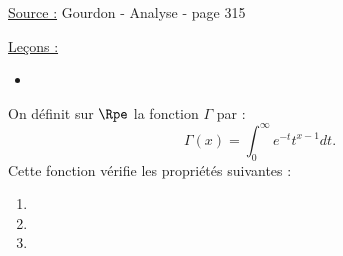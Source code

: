 

\pagestyle{fancy}

\fancyhead[C]{}
\fancyhead[R]{}



\underline{Source :} Gourdon - Analyse - page 315

\underline{Leçons :}
\begin{itemize}
\item 
\end{itemize}

\begin{thm}
On définit sur $\Rpe$ la fonction $\Gamma$ par :
\[ \Gamma(x) = \int_0^{\infty} e^{-t}t^{x-1} dt . \]
Cette fonction vérifie les propriétés suivantes :
\begin{enumerate}
\item
\item
\item
\end{enumerate}
\end{thm}


